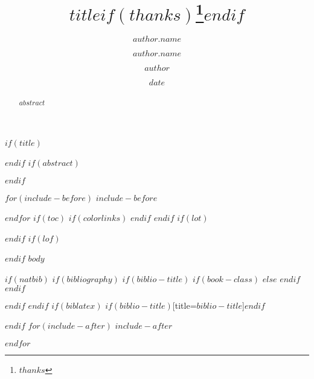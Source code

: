 \documentclass[$if(fontsize)$$fontsize$,$endif$$if(lang)$$babel-lang$,$endif$$if(papersize)$$papersize$paper,$endif$$for(classoption)$$classoption$$sep$,$endfor$]{$documentclass$}
\title{$title$$if(thanks)$\thanks{$thanks$}$endif$}
\author[$author.affiliation$]{$author.name$}
\affil[$address.code$]{$address.address$}
\author{$author.name$}
\author{$author$}
\date{$date$}
\begin{document}
\pagestyle{front}
$if(title)$
\maketitle
\thispagestyle{front}
$endif$
$if(abstract)$
\begin{abstract}
$abstract$
\end{abstract}
$endif$
\clearpage
\pagestyle{main}

$for(include-before)$
$include-before$

$endfor$
$if(toc)$
{
$if(colorlinks)$
\hypersetup{linkcolor=$if(toccolor)$$toccolor$$else$black$endif$}
$endif$
\setcounter{tocdepth}{$toc-depth$}
\tableofcontents
}
$endif$
$if(lot)$
\listoftables
$endif$
$if(lof)$
\listoffigures
$endif$
$body$

$if(natbib)$
$if(bibliography)$
$if(biblio-title)$
$if(book-class)$
\renewcommand\bibname{$biblio-title$}
$else$
\renewcommand\refname{$biblio-title$}
$endif$
$endif$
{\small
}

$endif$
$endif$
$if(biblatex)$
\printbibliography$if(biblio-title)$[title=$biblio-title$]$endif$

$endif$
$for(include-after)$
$include-after$

$endfor$
\end{document}

